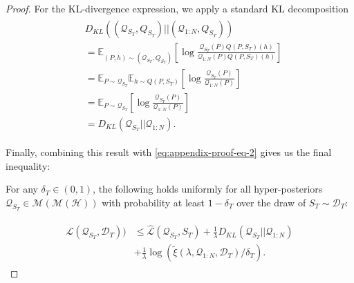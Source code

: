 \documentclass[letterpaper]{article} %
\theoremstyle{definition}
\newcommand{\Expect}[2]{\mathbb{E}_{#1}\left [#2 \right ]}
\begin{document}
\begin{proof}
	For the KL-divergence expression, we apply a standard KL decomposition
%	
	\begin{align*}
	\begin{split}
	&D_{KL}((\mathcal{Q}_{S_T}, Q_{S_T})||(\mathcal{Q}_{1:N}, Q_{S_T}))\\
	&=\Expect{(P,h)\sim (\mathcal{Q}_{S_T},Q_{S_T})}{\log\frac{\mathcal{Q}_{S_T}(P)Q(P, S_T)(h)}{\mathcal{Q}_{1:N}(P)Q(P, S_T)(h)}}\\
	&=\mathbb{E}_{P\sim \mathcal{Q}_{S_T}}\Expect{h\sim Q(P,S_T)}{\log\frac{\mathcal{Q}_{S_T}(P)}{\mathcal{Q}_{1:N}(P)}}\\
	&=\Expect{P\sim \mathcal{Q}_{S_T}}{\log\frac{\mathcal{Q}_{S_T}(P)}{\mathcal{Q}_{1:N}(P)}}\\
	&=D_{KL}(\mathcal{Q}_{S_T}||\mathcal{Q}_{1:N}) .
	\end{split}
	\end{align*}
	
	Finally, combining this result with \eqref{eq:appendix-proof-eq-2} gives us the final inequality:
	
	For any $\delta_T \in (0,1)$, the following holds uniformly for all hyper-posteriors $\mathcal{Q}_{S_T}\in \mathcal{M}(\mathcal{M}(\mathcal{H}))$ with probability at least $1-\delta_T$ over the draw of $S_T\sim \mathcal{D}_T$:
	
	\begin{align*}
	\begin{split}
	\mathcal{L}(\mathcal{Q}_{S_T}, \mathcal{D}_T)) &\leq \hat{\mathcal{L}}(\mathcal{Q}_{S_T}, S_T) + \frac{1}{\lambda}D_{KL}(\mathcal{Q}_{S_T}||\mathcal{Q}_{1:N})\\
	&+\frac{1}{\lambda}\log\left (\tilde{\xi}(\lambda,\mathcal{Q}_{1:N},\mathcal{D}_T)/\delta_T\right ) .
	\end{split}
	\end{align*}
	\end{proof}
	
\end{document}
